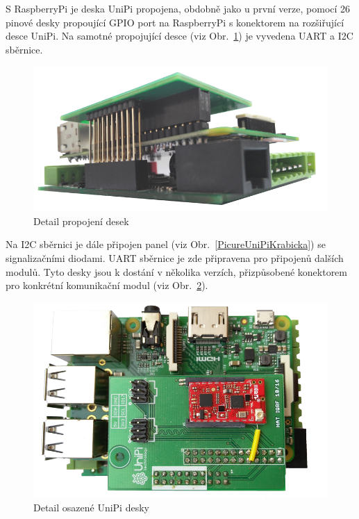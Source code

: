 S RaspberryPi je deska UniPi propojena, obdobně jako u první verze, pomocí 26 pinové desky propoující GPIO port na RaspberryPi s konektorem na rozšiřující desce UniPi. Na samotné propojující desce (viz Obr.~\ref{PicureUniPiConnectionImage}) je vyvedena UART a I2C sběrnice. 

 \begin{figure}[!h]
  \begin{center}
    \includegraphics[scale=0.30]{obrazky/unipi_propojbrain}
  \end{center}
	\caption{Detail propojení desek}
	\label{PicureUniPiConnectionImage}
\end{figure}

Na I2C sběrnici je dále připojen panel (viz Obr.~\ref{PicureUniPiKrabicka}) se signalizačními diodami. UART sběrnice je zde připravena pro připojenů dalších modulů. Tyto desky jsou k dostání v několika verzích, přizpůsobené konektorem pro konkrétní komunikační modul (viz Obr.~\ref{PicureUniPiOsazena}).

 \begin{figure}[!h]
  \begin{center}
    \includegraphics[scale=0.30]{obrazky/unipi_osazeny}
  \end{center}
	\caption{Detail osazené UniPi desky}
	\label{PicureUniPiOsazena}
\end{figure}

